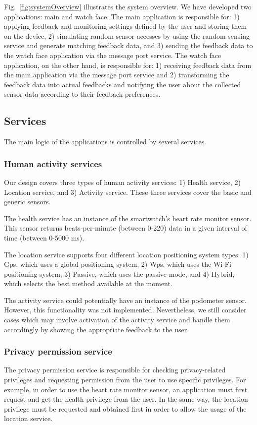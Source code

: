 \documentclass[conference, a4paper, 10pt, twocolumn]{IEEEtran}
\begin{document}
Fig.~\ref{fig:systemOverview} illustrates the system overview. We have developed two applications: main and watch face. The main application is responsible for: 1) applying feedback and monitoring settings defined by the user and storing them on the device, 2) simulating random sensor accesses by using the random sensing service and generate matching feedback data, and 3) sending the feedback data to the watch face application via the message port service. The watch face application, on the other hand, is responsible for: 1) receiving feedback data from the main application via the message port service and 2) transforming the feedback data into actual feedbacks and notifying the user about the collected sensor data according to their feedback preferences.

\subsection{Services}\label{services}
The main logic of the applications is controlled by several services.

\subsubsection{Human activity services}
Our design covers three types of human activity services: 1) Health service, 2) Location service, and 3) Activity service. These three services cover the basic and generic sensors.

The health service has an instance of the smartwatch's heart rate monitor sensor. This sensor returns beats-per-minute (between 0-220) data in a given interval of time (between 0-5000 ms).

The location service supports four different location positioning system types: 1) Gps, which uses a global positioning system, 2) Wps, which uses the Wi-Fi positioning system, 3) Passive, which uses the passive mode, and 4) Hybrid, which selects the best method available at the moment. 

The activity service could potentially have an instance of the podometer sensor. However, this functionality was not implemented. Nevertheless, we still consider cases which may involve activation of the activity service and handle them accordingly by showing the appropriate feedback to the user. 

\subsubsection{Privacy permission service}
The privacy permission service is responsible for checking privacy-related privileges and requesting permission from the user to use specific privileges. For example, in order to use the heart rate monitor sensor, an application must first request and get the health privilege from the user. In the same way, the location privilege must be requested and obtained first in order to allow the usage of the location service.
\end{document}
